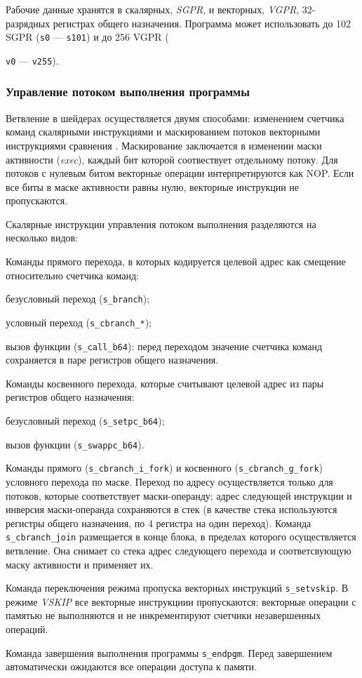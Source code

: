 \documentclass[a4paper,14pt]{extarticle}
\begin{document}
Рабочие данные хранятся в скалярных, \textit{SGPR}, и векторных, \textit{VGPR},
32-разрядных регистрах общего назначения. Программа может использовать до 102
SGPR (\verb|s0| — \verb|s101|) и до 256 VGPR ({\verb|v0| — \verb|v255|).

\subsubsection{Управление потоком выполнения программы}
\label{section:gcn-program-flow}

Ветвление в шейдерах осуществляется двумя способами: изменением счетчика команд скалярными
инструкциями и маскированием потоков векторными инструкциями сравнения \cite{vega-isa}.
Маскирование заключается в изменении маски активности (\textit{exec}), каждый бит которой
соотвествует отдельному потоку. Для потоков с нулевым битом векторные операции интерпретируются как NOP.
Если все биты в маске активности равны нулю, векторные инструкции не пропускаются.

Скалярные инструкции управления потоком выполнения разделяются на несколько видов:
\begin{ol}
\item Команды прямого перехода, в которых кодируется целевой адрес как смещение относительно счетчика команд:
  \begin{ul}
  \item безусловный переход (\verb|s_branch|);
  \item условный переход (\verb|s_cbranch_*|);
  \item вызов функции (\verb|s_call_b64|): перед переходом значение счетчика команд
  сохраняется в паре регистров общего назначения.
  \end{ul}
\item Команды косвенного перехода, которые считывают целевой адрес из пары регистров общего назначения:
  \begin{ul}
  \item безусловный переход (\verb|s_setpc_b64|);
  \item вызов функции (\verb|s_swappc_b64|).
  \end{ul}
\item Команды прямого (\verb|s_cbranch_i_fork|) и косвенного (\verb|s_cbranch_g_fork|)
  условного перехода по маске. Переход по адресу осуществляется только для потоков, которые соответствует
  маски-операнду; адрес следующей инструкции и инверсия маски-операнда сохраняются в стек
  (в качестве стека используются регистры общего назначения, по 4 регистра на один переход).
  Команда \verb|s_cbranch_join| размещается в конце блока, в пределах которого осуществляется ветвление.
  Она снимает со стека адрес следующего перехода и соответсвующую маску активности и применяет их.
\item Команда переключения режима пропуска векторных инструкций \verb|s_setvskip|. В режиме
  \textit{VSKIP} все векторные инструкциии пропускаются; векторные операции с памятью не выполняются
  и не инкрементируют счетчики незавершенных операций.
\item Команда завершения выполнения программы \verb|s_endpgm|. Перед завершением автоматически
  ожидаются все операции доступа к памяти.
\end{ol}

}
\end{document}
